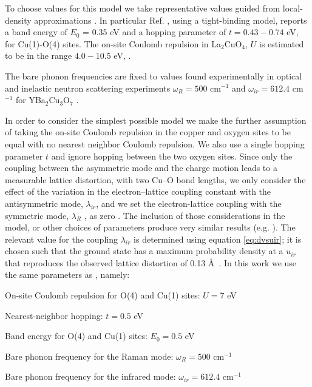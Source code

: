 To choose values for this model we take representative values guided from local-density approximations \cite{Pickett1989}. 
In particular Ref. \cite{DeWeert1989}, using a tight-binding model, reports a band energy of $E_0$ = 0.35 eV and a hopping parameter of $t=0.43-0.74$ eV, for Cu(1)-O(4) sites.
The on-site Coulomb repulsion in La$_2$CuO$_4$, $U$  is estimated to be in the range $4.0-10.5$ eV, \cite{Hybertsen1989}. 

The bare phonon frequencies are fixed to values found experimentally in optical and inelastic neutron scattering experiments $\omega_R = 500$ cm$^{-1}$ and $\omega_{ir} = 612.4$ cm$^{-1}$ for YBa$_2$Cu$_3$O$_7$ \cite{?}.

In order to consider the simplest possible model we make the further assumption of taking the on-site Coulomb repulsion in the copper and oxygen sites to be equal with no nearest neighbor Coulomb repulsion. 
We also use a single hopping parameter $t$ and ignore hopping between the two oxygen sites. 
Since only the coupling between the asymmetric mode and the charge motion leads to a measurable lattice distortion, with two Cu–O bond lengths, we only consider the effect of the variation in the electron–lattice coupling constant with the antisymmetric mode, $\lambda_{ir}$, and we set the electron-lattice coupling with the symmetric mode, $\lambda_R$ , as zero \cite{Salkola1995}. 
The inclusion of those considerations in the model, or other choices of parameters produce very similar results (e.g. \cite{Salkola1994, Salkola1995}).
The relevant value for the coupling $\lambda_{ir}$ is determined using equation \ref{eq:dvsuir}; it is chosen such that the ground state has a maximum probability density at a $u_{ir}$ that reproduces the observed lattice distortion of 0.13 \AA\ \cite{MustredeLeon1991}.
In this work we use the same parameters as \cite{DeLeon1999, Leon2008, MirandaMena2007,Mena2006}, namely:

\begin{itemize*}
\item On-site Coulomb repulsion for O(4) and Cu(1) sites: $U=7$ eV
\item Nearest-neighbor hopping: $t=0.5$ eV
\item Band energy for O(4) and Cu(1) sites: $E_0=0.5$ eV
\item Bare phonon frequency for the Raman mode: $\omega_R=500$ cm$^{-1}$
\item Bare phonon frequency for the infrared mode: $\omega_{ir}=612.4$ cm$^{-1}$
\end{itemize*}


